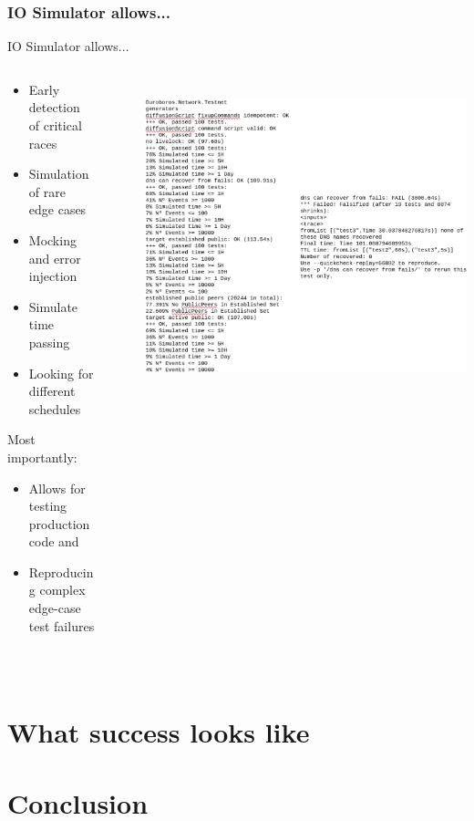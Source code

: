 \documentclass{beamer}
\begin{document}
\subsubsection*{IO Simulator allows...}
\begin{frame}{IO Simulator allows...}
  \begin{columns}
    \begin{column}{0.4\textwidth}
      \begin{itemize}
        \item Early detection of critical races
        \item Simulation of rare \alert{edge cases}
        \item Mocking and \alert{error injection}
        \item Simulate time passing
        \item Looking for \alert{different schedules}
      \end{itemize}
      Most importantly:
      \begin{itemize}
        \item Allows for testing production code and
        \item Reproducing complex edge-case test failures
      \end{itemize}
    
    \end{column}
    \begin{column}{0.6\textwidth}
      \includegraphics[scale=1.2, width=\textwidth]{code.png}
    \end{column}
  \end{columns}
\end{frame}

\section{What success looks like}

\section{Conclusion}
\end{document}
